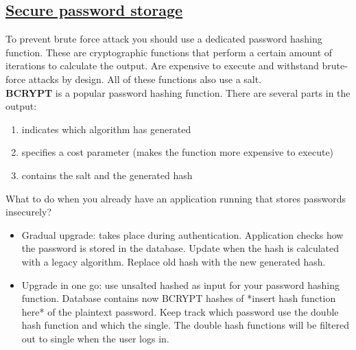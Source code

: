 \documentclass[titlepage]{article}
\begin{document}
    \subsection{\href{https://youtu.be/gFaLhMLg-hw}{Secure password storage}}
    To prevent brute force attack you should use a dedicated password hashing function. These are cryptographic functions that perform a certain amount of iterations to calculate the output. Are expensive to execute and withstand brute-force attacks by design. All of these functions also use a salt.\\
    \textbf{BCRYPT} is a popular password hashing function. There are several parts in the output:
    \begin{enumerate}
        \item indicates which algorithm has generated
        \item specifies a cost parameter (makes the function more expensive to execute)
        \item contains the salt and the generated hash
    \end{enumerate}
    What to do when you already have an application running that stores passwords insecurely?
    \begin{itemize}
        \item Gradual upgrade: takes place during authentication. Application checks how the password is stored in the database. Update when the hash is calculated with a legacy algorithm. Replace old hash with the new generated hash.
        \item Upgrade in one go: use unsalted hashed as input for your password hashing function. Database contains now BCRYPT hashes of *insert hash function here* of the plaintext password. Keep track which password use the double hash function and which the single. The double hash functions will be filtered out to single when the user logs in.
    \end{itemize}
\end{document}
